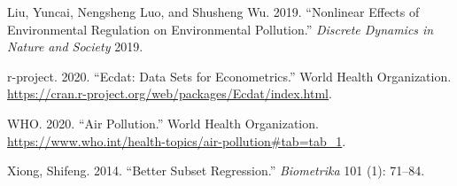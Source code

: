 \documentclass[
]{article}
\begin{document}
\leavevmode\hypertarget{ref-liu2019nonlinear}{}%
Liu, Yuncai, Nengsheng Luo, and Shusheng Wu. 2019. ``Nonlinear Effects
of Environmental Regulation on Environmental Pollution.'' \emph{Discrete
Dynamics in Nature and Society} 2019.

\leavevmode\hypertarget{ref-RstudioData}{}%
r-project. 2020. ``Ecdat: Data Sets for Econometrics.'' World Health
Organization.
\url{https://cran.r-project.org/web/packages/Ecdat/index.html}.

\leavevmode\hypertarget{ref-WHOestimation}{}%
WHO. 2020. ``Air Pollution.'' World Health Organization.
\url{https://www.who.int/health-topics/air-pollution\#tab=tab_1}.

\leavevmode\hypertarget{ref-xiong2014better}{}%
Xiong, Shifeng. 2014. ``Better Subset Regression.'' \emph{Biometrika}
101 (1): 71--84.
\end{document}
